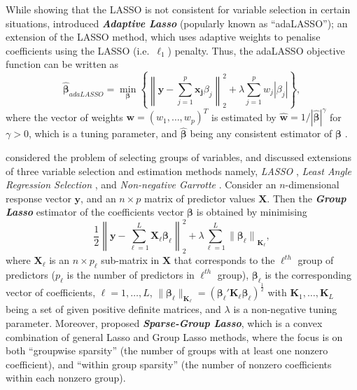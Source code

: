 \documentclass[
  11pt,
  a4paper,
]{article}
\begin{document}
While showing that the LASSO is not consistent for variable selection in
certain situations, \textcite{Zou2006} introduced \textbf{\emph{Adaptive
Lasso}} (popularly known as ``adaLASSO''); an extension of the LASSO
method, which uses adaptive weights to penalise coefficients using the
LASSO (i.e.~\(\ell_{1}\)) penalty. Thus, the adaLASSO objective function
can be written as \[
 \bm{\hat{\beta}}_{adaLASSO} = \min_{\bm{\beta}}\left\{\left\lVert\bm{y} - \sum_{j=1}^{p} {\bm{x_{j}}\beta_{j}}\right\rVert_{2}^{2} + \lambda\sum_{j=1}^{p} {w_{j}|\beta_{j}|}\right\},
\] where the vector of weights
\(\bm{w} = \left (w_{1}, \dots, w_{p} \right )^{T}\) is estimated by
\(\bm{\hat{w}} = 1/|\bm{\hat{\beta}}|^{\gamma}\) for \(\gamma > 0\),
which is a tuning parameter, and \(\bm{\hat{\beta}}\) being any
consistent estimator of \(\bm{\beta}\) \autocite{Zou2006}.

\textcite{Yuan2006} considered the problem of selecting groups of
variables, and discussed extensions of three variable selection and
estimation methods namely, \emph{LASSO} \autocite{Tibshirani1996},
\emph{Least Angle Regression Selection} \autocite[LARS,][]{Efron2004},
and \emph{Non-negative Garrotte} \autocite{Breiman1995}. Consider an
\(n\)-dimensional response vector \(\bm{y}\), and an \(n \times p\)
matrix of predictor values \(\bm{X}\). Then the \textbf{\emph{Group
Lasso}} estimator of the coefficients vector \(\bm{\beta}\) is obtained
by minimising \[
 \frac{1}{2}\left\lVert\bm{y} - \sum_{\ell=1}^{L} {\bm{X}_{\ell}\bm{\beta}_{\ell}}\right\rVert_{2}^{2} + \lambda\sum_{\ell=1}^{L} {\lVert\bm{\beta}_{\ell}\rVert}_{\bm{K}_{\ell}},
\] where \(\bm{X}_{\ell}\) is an \(n \times p_{\ell}\) sub-matrix in
\(\bm{X}\) that corresponds to the \(\ell^{th}\) group of predictors
(\(p_{\ell}\) is the number of predictors in \(\ell^{th}\) group),
\(\bm{\beta}_{\ell}\) is the corresponding vector of coefficients,
\(\ell = 1, \dots, L\),
\(\lVert\bm{\beta}_{\ell}\rVert_{\bm{K}_{\ell}} = (\bm{\beta}_{\ell}' \bm{K}_{\ell} \bm{\beta}_{\ell})^{\frac{1}{2}}\)
with \(\bm{K}_{1}, \dots, \bm{K}_{L}\) being a set of given positive
definite matrices, and \(\lambda\) is a non-negative tuning parameter.
Moreover, \textcite{Simon2013} proposed \textbf{\emph{Sparse-Group
Lasso}}, which is a convex combination of general Lasso and Group Lasso
methods, where the focus is on both ``groupwise sparsity'' (the number
of groups with at least one nonzero coefficient), and ``within group
sparsity'' (the number of nonzero coefficients within each nonzero
group).
\end{document}
